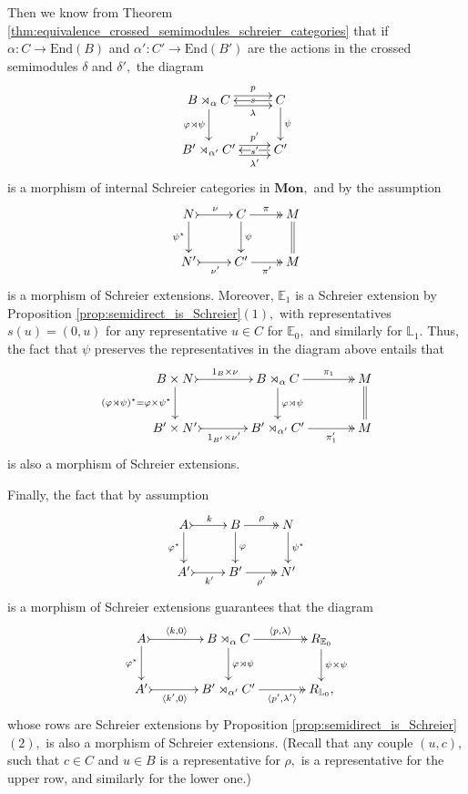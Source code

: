 \documentclass[a4paper]{amsart}
\theoremstyle{plain}
\theoremstyle{definition}
\theoremstyle{remark}
\newcommand{\la}{\langle}
\newcommand{\ra}{\rangle}
\begin{document}
Then we know from Theorem \ref{thm:equivalence_crossed_semimodules_schreier_categories} that if $\alpha\colon C\rightarrow\mathrm{End}(B)$ and $\alpha'\colon C'\rightarrow\mathrm{End}(B')$ are the actions in the crossed semimodules $\delta$ and $\delta',$ the diagram
\begin{equation*}
\xymatrix{
{B\rtimes_{\alpha}C} \ar[d]_-{\varphi\rtimes\psi} \ar@<.9ex>[r]^-{p} \ar@<-.9ex>[r]_-{\lambda} &{C} \ar[d]^-{\psi} \ar[l]|-{s} \\
{B'\rtimes_{\alpha'}C'} \ar@<.9ex>[r]^-{p'} \ar@<-.9ex>[r]_-{\lambda'} &{C'} \ar[l]|-{s'}
}
\end{equation*}
is a morphism of internal Schreier categories in $\mathbf{Mon},$ and by the assumption
\begin{equation*}
\xymatrix{
N \ar@{>->}[r]^-{\nu} \ar[d]_-{\psi^\star} &{C} \ar@{->>}[r]^-{\pi} \ar[d]^-{\psi} &{M} \ar@{=}[d]\\
{N'} \ar@{>->}[r]_-{\nu'} &{C'} \ar@{->>}[r]_-{\pi'} &{M}
}
\end{equation*}
is a morphism of Schreier extensions. Moreover, ${\mathbb{E}}_1$ is a Schreier extension by Proposition \ref{prop:semidirect_is_Schreier}$(1),$ with representatives $s(u)=(0,u)$ for any representative $u\in C$ for ${\mathbb{E}}_0,$ and similarly for ${\mathbb{L}}_1.$ Thus, the fact that $\psi$ preserves the representatives in the diagram above entails that
\begin{equation*}
\xymatrixcolsep{3pc}
\xymatrix{
{B\times N } \ar[d]_-{(\varphi\rtimes\psi)^\star=\varphi\times \psi^\star} \ar@{>->}[r]^-{1_B\times\nu} &{B\rtimes_{\alpha}C}  \ar[d]^-{\varphi\rtimes\psi} \ar@{->>}[r]^-{\pi_1} &{M} \ar@{=}[d] \\
{B'\times N'} \ar@{>->}[r]_-{1_{B'}\times\nu'} &{B'\rtimes_{\alpha'}C'} \ar@{->>}[r]_-{\pi'_1} &{M}
}
\end{equation*}
is also a morphism of Schreier extensions.

Finally, the fact that by assumption
\begin{equation*}
\xymatrix{
A \ar@{>->}[r]^-{k} \ar[d]_-{\varphi^\star} &{B} \ar@{->>}[r]^-{\rho} \ar[d]^-{\varphi} &{N} \ar[d]^-{\psi^\star}\\
{A'} \ar@{>->}[r]_-{k'} &{B'} \ar@{->>}[r]_-{\rho'} &{N'}
}
\end{equation*}
is a morphism of Schreier extensions guarantees that the diagram
\begin{equation*}
\xymatrixcolsep{3pc}
\xymatrix{
A \ar@{>->}[r]^-{\la k,0\ra} \ar[d]_-{\varphi^\star} &{B\rtimes_{\alpha}C} \ar@{->>}[r]^-{\la p,\lambda\ra} \ar[d]^-{\varphi\rtimes\psi} &{R_{{\mathbb{E}}_0}} \ar[d]^-{\psi\times\psi}\\
{A'} \ar@{>->}[r]_-{\la k',0\ra} &{B'\rtimes_{\alpha'}C'} \ar@{->>}[r]_-{\la p',\lambda'\ra}  &{R_{{\mathbb{L}}_0},}
}
\end{equation*}
whose rows are Schreier extensions by Proposition \ref{prop:semidirect_is_Schreier}$(2),$ is also a morphism of Schreier extensions. (Recall that any couple $(u,c),$ such that $c\in C$ and $u\in B$ is a representative for $\rho,$ is a representative for the upper row, and similarly for the lower one.)
\end{document}
